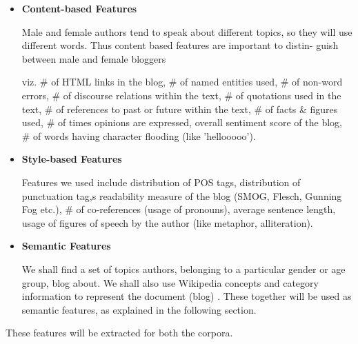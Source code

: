 \documentclass{sig-alternate}
\begin{document}
\begin{itemize}
\item \textbf{Content-based Features} 

Male and female authors tend to speak about different topics,
so they will use different words. Thus content based features are important to distin-
guish between male and female bloggers

viz. \# of HTML links in the blog, \# of named entities used, \# of non-word errors, \# of discourse relations within the text, \# of quotations used in the text, \# of references to past or future within the text, \# of facts \& figures used, \# of times opinions are expressed, overall sentiment score of the blog, \# of words having character flooding (like 'hellooooo').

\item \textbf{Style-based Features} 

Features we used include distribution of POS tags, distribution of punctuation tag,s readability measure of the blog (SMOG, Flesch, Gunning Fog etc.), \# of co-references (usage of pronouns), average sentence length, usage of figures of speech by the author (like metaphor, alliteration). 
\item \textbf{Semantic Features}

We shall find a set of topics authors, belonging to a particular gender or age group, blog about. We shall also use Wikipedia concepts and category information to represent the document (blog) \cite{iiit-god}. These together will be used as semantic features, as explained in the following section.
\end{itemize}
These features will be extracted for both the corpora.
\end{document}
